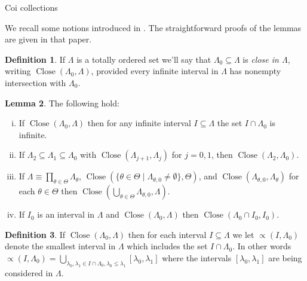 \documentclass{amsart}
\theoremstyle{definition}\newtheorem{theorem}{Theorem}
\theoremstyle{definition}\newtheorem*{A}{Main Theorem}
\theoremstyle{definition}\newtheorem*{B}{Theorem \ref{elementaryequiv}}
\theoremstyle{definition}\newtheorem*{C}{Theorem \ref{continuous}}
\theoremstyle{definition}\newtheorem*{D}{Theorem \ref{bigisomorphism2}}
\theoremstyle{definition}\newtheorem{bigtheorem}{Main Theorem}
\numberwithin{theorem}{section}
\theoremstyle{definition}\newtheorem{corollary}[theorem]{Corollary}
\theoremstyle{definition}\newtheorem{proposition}[theorem]{Proposition}
\theoremstyle{definition}\newtheorem{definition}[theorem]{Definition}
\theoremstyle{definition}\newtheorem{question}[theorem]{Question}
\theoremstyle{definition}\newtheorem{example}[theorem]{Example}
\theoremstyle{definition}\newtheorem{remark}[theorem]{Remark}
\theoremstyle{definition}\newtheorem{note}[theorem]{Note}
\theoremstyle{definition}\newtheorem{lemma}[theorem]{Lemma}
\theoremstyle{definition}\newtheorem{fact}[theorem]{Fact}
\theoremstyle{definition}\newtheorem{define}[theorem]{Definition}
\theoremstyle{definition}\newtheorem{claim}[theorem]{Claim}
\theoremstyle{definition}\newtheorem{obs}[theorem]{Observation}
\theoremstyle{definition}\newtheorem{definitions}[theorem]{Definitions}
\newcommand{\Close}{\operatorname{Close}}
\begin{document}
\begin{section}{Coi collections}\label{Howtoisomorphize}

We recall some notions introduced in \cite{Cors}.  The straightforward proofs of the lemmas are given in that paper.

\begin{definition}  If $\Lambda$ is a totally ordered set we'll say that $\Lambda_0 \subseteq \Lambda$ is \emph{close in $\Lambda$}, writing $\Close(\Lambda_0, \Lambda)$, provided every infinite interval in $\Lambda$ has nonempty intersection with $\Lambda_0$.  
\end{definition}

\begin{lemma}\label{basiccloseproperties}  The following hold:

\begin{enumerate}[(i)]

\item  If $\Close(\Lambda_0, \Lambda)$ then for any infinite interval $I \subseteq \Lambda$ the set $I \cap \Lambda_0$ is infinite.

\item  If $\Lambda_2 \subseteq \Lambda_1 \subseteq \Lambda_0$ with $\Close(\Lambda_{j+1}, \Lambda_j)$  for $j = 0, 1$, then $\Close(\Lambda_2, \Lambda_0)$.

\item  If $\Lambda \equiv \prod_{\theta \in \Theta} \Lambda_{\theta}$, $\Close(\{\theta \in \Theta \mid \Lambda_{\theta, 0} \neq \emptyset\}, \Theta)$, and $\Close(\Lambda_{\theta, 0}, \Lambda_{\theta})$ for each $\theta \in \Theta$ then $\Close(\bigcup_{\theta \in \Theta} \Lambda_{\theta, 0}, \Lambda)$.

\item  If  $I_0$ is an interval in $\Lambda$ and $\Close(\Lambda_0, \Lambda)$ then $\Close(\Lambda_0 \cap I_0, I_0)$.

 
\end{enumerate}

\end{lemma}

\begin{definition}  If $\Close(\Lambda_0, \Lambda)$ then for each interval $I \subseteq \Lambda$ we let $\varpropto(I, \Lambda_0)$ denote the smallest interval in $\Lambda$ which includes the set $I \cap \Lambda_0$.  In other words $\varpropto(I, \Lambda_0) =  \bigcup_{\lambda_0, \lambda_1 \in I \cap \Lambda_0, \lambda_0 \leq \lambda_1} [\lambda_0, \lambda_1]$ where the intervals $[\lambda_0, \lambda_1]$ are being considered in $\Lambda$.
\end{definition}



\end{section}
\end{document}
